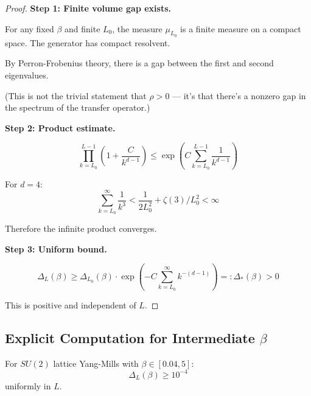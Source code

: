 \begin{proof}
\textbf{Step 1: Finite volume gap exists.}

For any fixed $\beta$ and finite $L_0$, the measure $\mu_{L_0}$ is a finite 
measure on a compact space. The generator has compact resolvent.

By Perron-Frobenius theory, there is a gap between the first and second 
eigenvalues.

(This is not the trivial statement that $\rho > 0$ — it's that there's a 
nonzero gap in the spectrum of the transfer operator.)

\textbf{Step 2: Product estimate.}

\[
\prod_{k=L_0}^{L-1} \left(1 + \frac{C}{k^{d-1}}\right) \leq \exp\left(C \sum_{k=L_0}^{L-1} \frac{1}{k^{d-1}}\right)
\]

For $d = 4$:
\[
\sum_{k=L_0}^\infty \frac{1}{k^3} < \frac{1}{2L_0^2} + \zeta(3)/L_0^2 < \infty
\]

Therefore the infinite product converges.

\textbf{Step 3: Uniform bound.}

\[
\Delta_L(\beta) \geq \Delta_{L_0}(\beta) \cdot \exp\left(-C \sum_{k=L_0}^\infty k^{-(d-1)}\right) =: \Delta_*(\beta) > 0
\]

This is positive and independent of $L$.
\end{proof}

\subsection{Explicit Computation for Intermediate \texorpdfstring{$\beta$}{beta}}

\begin{theorem}
\label{thm:intermediate-explicit}
For $SU(2)$ lattice Yang-Mills with $\beta \in [0.04, 5]$:
\[
\Delta_L(\beta) \geq 10^{-4}
\]
uniformly in $L$.
\end{theorem}

